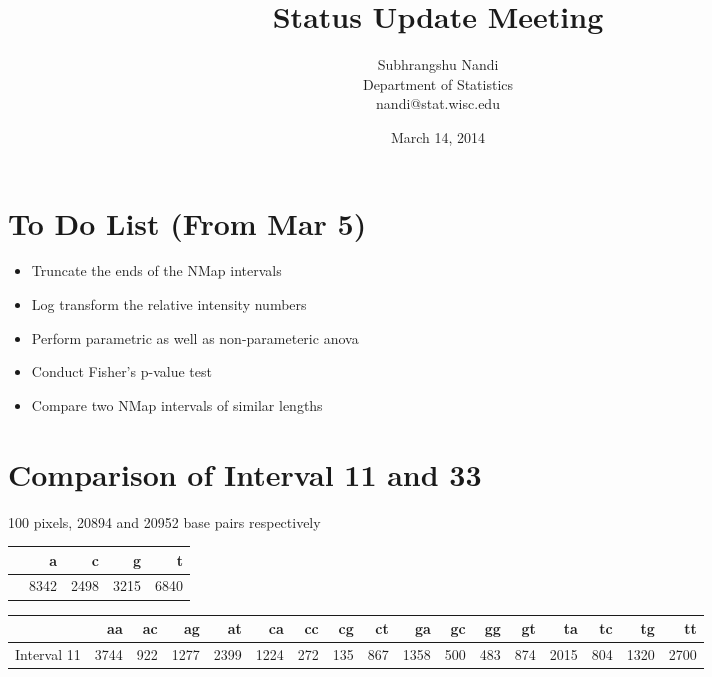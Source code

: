 \documentclass[14pt]{article}
\begin{document}


\title{Status Update Meeting}
\author{Subhrangshu Nandi\\
  Department of Statistics\\
  nandi@stat.wisc.edu}
\date{March 14, 2014}
\maketitle

\section*{To Do List (From Mar 5)}
\begin{itemize}
\item
{\Large Truncate the ends of the NMap intervals}
\item
{\Large Log transform the relative intensity numbers}
\item
{\Large Perform parametric as well as non-parameteric anova}
\item
{\Large Conduct Fisher's p-value test}
\item
{\Large Compare two NMap intervals of similar lengths}
\end{itemize}

\section*{Comparison of Interval 11 and 33}
{\Large 100 pixels, 20894 and 20952 base pairs respectively}

\begin{table}[ht]
\centering
\begin{tabular}{rrrrr}
  \hline
 & a & c & g & t \\ 
  \hline
 & 8342 & 2498 & 3215 & 6840 \\ 
   \hline
\end{tabular}
\end{table}

\begin{table}[ht]
\centering
\begin{tabular}{rrrrrrrrrrrrrrrrr}
  \hline
 & aa & ac & ag & at & ca & cc & cg & ct & ga & gc & gg & gt & ta & tc & tg & tt \\ 
  \hline
Interval 11 & 3744 & 922 & 1277 & 2399 & 1224 & 272 & 135 & 867 & 1358 & 500 & 483 & 874 & 2015 & 804 & 1320 & 2700 \\ 
   \hline
\end{tabular}
\end{table}
\end{document}
